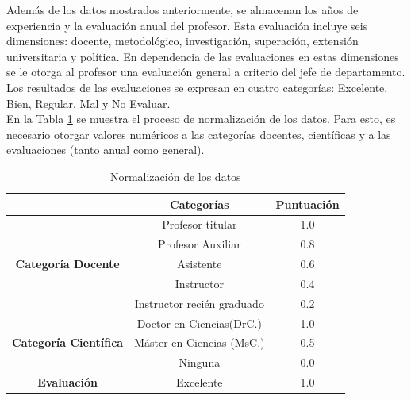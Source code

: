 Además de los datos mostrados anteriormente, se almacenan los años de experiencia y la evaluación anual del profesor. Esta evaluación incluye seis dimensiones: docente, metodológico, investigación, superación, extensión universitaria y política. En dependencia de las evaluaciones en estas dimensiones se le otorga al profesor una evaluación general a criterio del jefe de departamento. Los resultados de las evaluaciones se expresan en cuatro categorías: Excelente, Bien, Regular, Mal y No Evaluar. \\

En la Tabla \ref{norm-datos-carga} se muestra el proceso de normalización de los datos. Para esto, es necesario otorgar valores numéricos a las categorías docentes, científicas y a las evaluaciones (tanto anual como general). 

\begin{table} [H]
	\centering
	\caption{Normalización de los datos} \label{norm-datos-carga}
	\begin{tabular}{|c|c|c|}
		\cline{2-3}
		             \multicolumn{1}{c|}{}               &    \textbf{Categorías}     & \textbf{Puntuación} \\ \hline
		 \multirow{5}{3cm}{\textbf{Categoría Docente}}   &      Profesor titular      &         1.0         \\ \cline{2-3}
		                                                 &     Profesor Auxiliar      &         0.8         \\ \cline{2-3}
		                                                 &         Asistente          &         0.6         \\ \cline{2-3}
		                                                 &         Instructor         &         0.4         \\ \cline{2-3}
		                                                 & Instructor recién graduado &         0.2         \\ \hline\hline
		\multirow{3}{3cm}{\textbf{Categoría Científica}} &  Doctor en Ciencias(DrC.)  &         1.0         \\ \cline{2-3}
		                                                 & Máster en Ciencias (MsC.)  &         0.5         \\ \cline{2-3}
		                                                 &          Ninguna           &         0.0         \\ \hline\hline
		     \multirow{5}{3cm}{\textbf{Evaluación}}      &         Excelente          &         1.0         \\ \cline{2-3}

\end{tabular}
\end{table}
